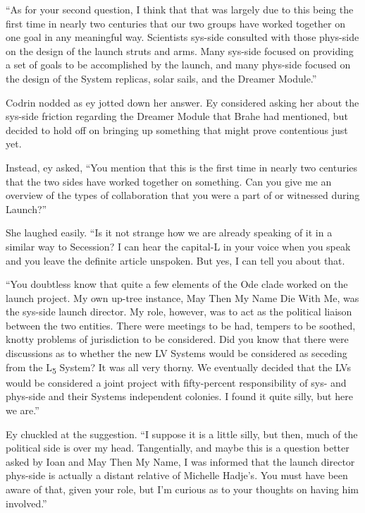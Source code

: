 ``As for your second question, I think that that was largely due to this being the first time in nearly two centuries that our two groups have worked together on one goal in any meaningful way. Scientists sys-side consulted with those phys-side on the design of the launch struts and arms. Many sys-side focused on providing a set of goals to be accomplished by the launch, and many phys-side focused on the design of the System replicas, solar sails, and the Dreamer Module.''

Codrin nodded as ey jotted down her answer. Ey considered asking her about the sys-side friction regarding the Dreamer Module that Brahe had mentioned, but decided to hold off on bringing up something that might prove contentious just yet.

Instead, ey asked, ``You mention that this is the first time in nearly two centuries that the two sides have worked together on something. Can you give me an overview of the types of collaboration that you were a part of or witnessed during Launch?''

She laughed easily. ``Is it not strange how we are already speaking of it in a similar way to Secession? I can hear the capital-L in your voice when you speak and you leave the definite article unspoken. But yes, I can tell you about that.

``You doubtless know that quite a few elements of the Ode clade worked on the launch project. My own up-tree instance, May Then My Name Die With Me, was the sys-side launch director. My role, however, was to act as the political liaison between the two entities. There were meetings to be had, tempers to be soothed, knotty problems of jurisdiction to be considered. Did you know that there were discussions as to whether the new LV Systems would be considered as seceding from the L\textsubscript{5} System? It was all very thorny. We eventually decided that the LVs would be considered a joint project with fifty-percent responsibility of sys- and phys-side and their Systems independent colonies. I found it quite silly, but here we are.''\pagebreak

Ey chuckled at the suggestion. ``I suppose it is a little silly, but then, much of the political side is over my head. Tangentially, and maybe this is a question better asked by Ioan and May Then My Name, I was informed that the launch director phys-side is actually a distant relative of Michelle Hadje's. You must have been aware of that, given your role, but I'm curious as to your thoughts on having him involved.''

